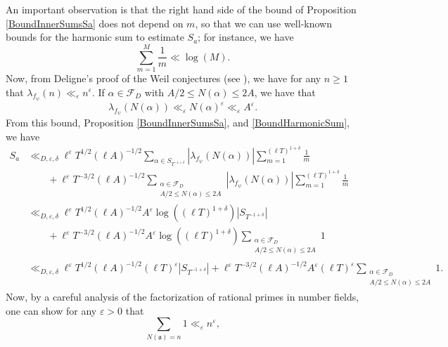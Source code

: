\documentclass[11pt]{amsart}
\theoremstyle{definition}
\theoremstyle{remark}
\begin{document}
An important observation is that the right hand side of the bound of Proposition \ref{BoundInnerSumsSa} does not depend on $m$, so that we can use well-known bounds for the harmonic sum to estimate $S_a$; for instance, we have 
\begin{equation}
    \sum_{m=1}^{M} \frac{1}{m} \ll \log(M). \label{BoundHarmonicSum}
\end{equation}
Now, from Deligne's proof of the Weil conjectures (see \cite{Deligne-WeilConj}), we have for any $n\geq 1$ that $\lambda_{f_{\psi}}(n) \ll_{\varepsilon} n^{\varepsilon}$. If $\alpha \in \mathcal{F}_{D}$ with $A/2 \leq N(\alpha) \leq 2A$, we have that $$ \lambda_{f_{\psi}}(N(\alpha)) \ll_{\varepsilon} N(\alpha)^{\varepsilon} \ll_{\varepsilon} A^{\varepsilon}.$$ From this bound, Proposition \ref{BoundInnerSumsSa}, and \eqref{BoundHarmonicSum}, we have
\begin{align}
    S_a &\ll_{D,\varepsilon,\delta} \ell^{\varepsilon} T^{1/2} (\ell A)^{-1/2} \sum_{\alpha \in S_{T^{-1+\delta}}} |\lambda_{f_{\psi}}(N(\alpha))| \sum_{m=1}^{(\ell T)^{1+\delta}} \frac{1}{m} \label{MainBound6} \\
    &\qquad + \ell^{\varepsilon} T^{-3/2} (\ell A)^{-1/2} \sum_{\substack{\alpha \in \mathcal{F}_{D} \\ A/2 \leq N(\alpha) \leq 2A}} |\lambda_{f_{\psi}}(N(\alpha))| \sum_{m=1}^{(\ell T)^{1+\delta}} \frac{1}{m} \nonumber \\
    &\ll_{D,\varepsilon,\delta} \ell^{\varepsilon} T^{1/2} (\ell A)^{-1/2} A^{\varepsilon} \log\left((\ell T)^{1+\delta}\right) \left| S_{T^{-1+\delta}} \right| \nonumber \\
    &\qquad + \ell^{\varepsilon} T^{-3/2} (\ell A)^{-1/2} A^{\varepsilon} \log\left((\ell T)^{1+\delta}\right) \sum_{\substack{\alpha \in \mathcal{F}_{D} \\ A/2 \leq N(\alpha) \leq 2A}} 1 \nonumber \\
    &\ll_{D,\varepsilon,\delta} \ell^{\varepsilon} T^{1/2} (\ell A)^{-1/2} (\ell T)^{\varepsilon} \left| S_{T^{-1+\delta}} \right| + \ell^{\varepsilon} T^{-3/2} (\ell A)^{-1/2} A^{\varepsilon} (\ell T)^{\varepsilon} \sum_{\substack{\alpha \in \mathcal{F}_{D} \\ A/2 \leq N(\alpha) \leq 2A}} 1. \nonumber
\end{align}
Now, by a careful analysis of the factorization of rational primes in number fields, one can show for any $\varepsilon>0$ that 
\begin{equation}
    \sum_{N(\mathfrak{a}) = n} 1 \ll_{\varepsilon} n^{\varepsilon}, \label{NumberIdealsGivenNorm}
\end{equation}
\end{document}
